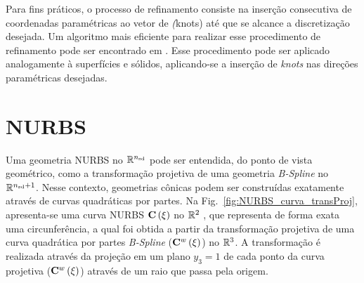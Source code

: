 \documentclass[tese_patricia]{subfiles}
\begin{document}
Para fins práticos, o processo de refinamento consiste na inserção consecutiva de coordenadas paramétricas ao vetor de \textit(knots) até que se alcance a discretização desejada. Um algoritmo mais eficiente para realizar esse procedimento de refinamento pode ser encontrado em . Esse procedimento pode ser aplicado analogamente à superfícies e sólidos, aplicando-se a inserção de \textit{knots} nas direções paramétricas desejadas.


\section{NURBS}

Uma geometria NURBS no $\mathbb{R}^{{n_{\mathrm{sd}}}}$ pode ser entendida, do ponto de vista geométrico, como a transformação projetiva de uma geometria \textit{B-Spline} no $\mathbb{R}^{{n_{\mathrm{sd}}}+1}$. Nesse contexto, geometrias cônicas podem ser construídas exatamente através de curvas quadráticas por partes. Na Fig.~\ref{fig:NURBS_curva_transProj}, apresenta-se uma curva NURBS $\mathbf{C}\left(\xi\right)$ no $\mathbb{R}^{2}$ , que representa de forma exata uma circunferência, a qual foi obtida a partir da transformação projetiva de uma curva quadrática por partes \textit{B-Spline} ($\mathbf{C}^{w}\left(\xi\right)$) no  $\mathbb{R}^{3}$. A transformação é realizada através da projeção em um plano $y_3 = 1$ de cada ponto da curva projetiva ($\mathbf{C}^{w}\left(\xi\right)$) através de um raio que passa pela origem.
\end{document}

